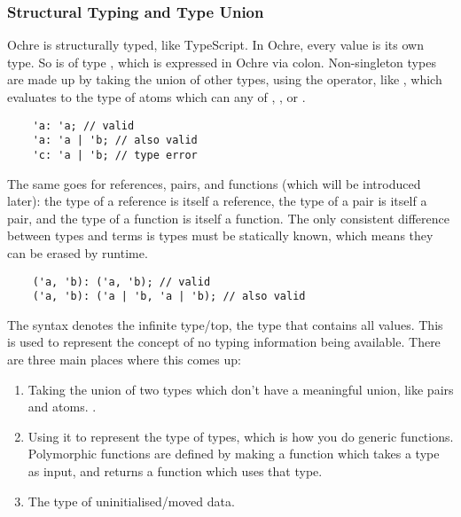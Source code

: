 \documentclass[12pt,twoside]{report}
\begin{document}
\subsubsection{Structural Typing and Type Union}
Ochre is structurally typed, like TypeScript. In Ochre, every value is its own type. So  is of type , which is expressed in Ochre via colon. Non-singleton types are made up by taking the union of other types, using the \mono{|} operator, like , which evaluates to the type of atoms which can any of , , or .

  \begin{verbatim}
    'a: 'a; // valid
    'a: 'a | 'b; // also valid
    'c: 'a | 'b; // type error
  \end{verbatim}

The same goes for references, pairs, and functions (which will be introduced later): the type of a reference is itself a reference, the type of a pair is itself a pair, and the type of a function is itself a function. The only consistent difference between types and terms is types must be statically known, which means they can be erased by runtime.

  \begin{verbatim}
    ('a, 'b): ('a, 'b); // valid
    ('a, 'b): ('a | 'b, 'a | 'b); // also valid
  \end{verbatim}

The \mono{*} syntax denotes the infinite type/top, the type that contains all values. This is used to represent the concept of no typing information being available. There are three main places where this comes up:

\begin{enumerate}
  \item Taking the union of two types which don't have a meaningful union, like pairs and atoms. .
  \item Using it to represent the type of types, which is how you do generic functions. Polymorphic functions are defined by making a function which takes a type as input, and returns a function which uses that type.
  \item The type of uninitialised/moved data.
\end{enumerate}
\end{document}
